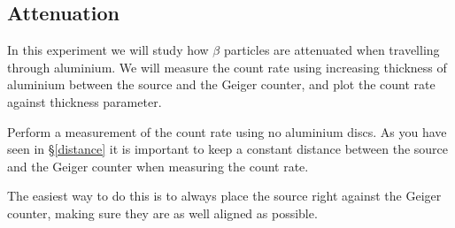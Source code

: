 \subsection{Attenuation}

In this experiment we will study how $\beta$ particles are attenuated when travelling through aluminium. We will measure the count rate using increasing thickness of aluminium between the source and the Geiger counter, and plot the count rate against thickness parameter.

Perform a measurement of the count rate using no aluminium discs. As you have seen in \S \ref{distance} it is important to keep a constant distance between the source and the Geiger counter when measuring the count rate.

The easiest way to do this is to always place the source right against the Geiger counter, making sure they are as well aligned as possible.